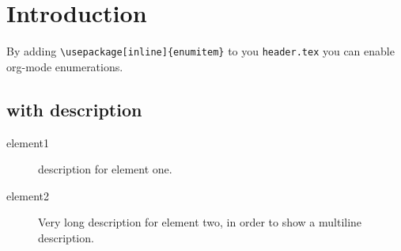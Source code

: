 


\section{Introduction}
\label{sec:orgbcb260f}
By adding \texttt{\textbackslash{}usepackage[inline]\{enumitem\}} to you \texttt{header.tex} you can enable
org-mode enumerations.
\subsection{with description}
\label{sec:orga998b86}
\begin{description}
\item[{element1}] description for element one.
\item[{element2}] Very long description for element two, in order to show a
multiline description.
\end{description}


